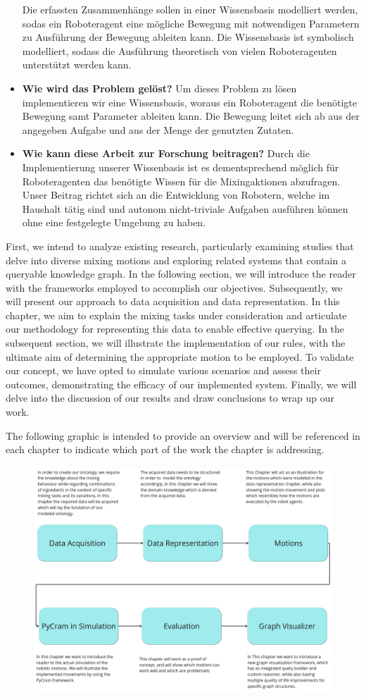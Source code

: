 \begin{itemize}
    Die erfassten Zusammenhänge sollen in einer Wissensbasis modelliert werden, sodas ein Roboteragent eine mögliche Bewegung mit notwendigen Parametern zu Ausführung der Bewegung
    ableiten kann. Die Wissensbasis ist symbolisch modelliert, sodass die Ausführung theoretisch von vielen Roboteragenten unterstützt werden kann.
    \item \textbf{Wie wird das Problem gelöst?} Um dieses Problem zu lösen implementieren wir eine Wissensbasis, 
    woraus ein Roboteragent die benötigte Bewegung samt Parameter ableiten kann. Die Bewegung leitet sich ab aus der angegeben Aufgabe und aus der Menge der genutzten Zutaten.
    \item \textbf{Wie kann diese Arbeit zur Forschung beitragen?} Durch die Implementierung unserer Wissenbasis ist es dementsprechend möglich für Roboteragenten das benötigte Wissen für die Mixingaktionen abzufragen. Unser Beitrag richtet sich an die Entwicklung von Robotern, welche im Haushalt tätig sind und autonom nicht-triviale Aufgaben ausführen können ohne eine festgelegte Umgebung zu haben.
\end{itemize}


First, we intend to analyze existing research, particularly examining studies that delve into diverse mixing motions and exploring related systems that contain a queryable knowledge graph.
In the following section, we will introduce the reader with the frameworks employed to accomplish our objectives.	
Subsequently, we will present our approach to data acquisition and data representation.
In this chapter, we aim to explain the mixing tasks under consideration and articulate our methodology for representing this data to enable effective querying.
In the subsequent section, we will illustrate the implementation of our rules, with the ultimate aim of determining the appropriate motion to be employed.
To validate our concept, we have opted to simulate various scenarios and assess their outcomes, demonstrating the efficacy of our implemented system.
Finally, we will delve into the discussion of our results and draw conclusions to wrap up our work.

The following graphic is intended to provide an overview and will be referenced in each chapter to indicate which part of the work the chapter is addressing.
\begin{figure}[H]
    \includegraphics[scale=0.36]{Graphics/overview.jpg}
\end{figure}